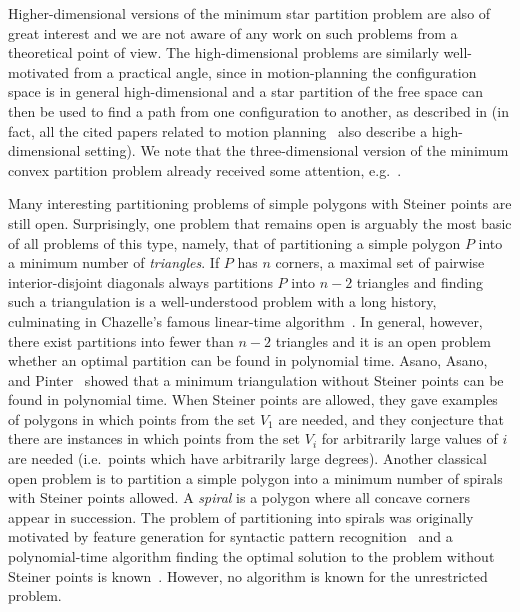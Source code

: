\documentclass[10pt,a4paper]{article}
\begin{document}
Higher-dimensional versions of the minimum star partition problem are also of great interest and we are not aware of any work on such problems from a theoretical point of view.
The high-dimensional problems are similarly well-motivated from a practical angle, since in motion-planning the configuration space is in general high-dimensional and a star partition of the free space can then be used to find a path from one configuration to another, as described in  (in fact, all the cited papers related to motion planning~\cite{varadhan2005star,dobson2014sparse, SPBG:SPBG07:073-080, lien2009planning, zhang2006fast} also describe a high-dimensional setting).
We note that the three-dimensional version of the minimum convex partition problem already received some attention, e.g.~\cite{DBLP:journals/algorithmica/ChazelleP97,DBLP:journals/siamcomp/BajajD92,DBLP:journals/siamcomp/Chazelle84}.

Many interesting partitioning problems of simple polygons with Steiner points are still open.
Surprisingly, one problem that remains open is arguably the most basic of all problems of this type, namely, that of partitioning a simple polygon $P$ into a minimum number of \emph{triangles}.
If $P$ has $n$ corners, a maximal set of pairwise interior-disjoint diagonals always partitions $P$ into $n-2$ triangles and finding such a triangulation is a well-understood problem with a long history, culminating in Chazelle's famous linear-time algorithm~\cite{DBLP:journals/dcg/Chazelle91}.
In general, however, there exist partitions into fewer than $n-2$ triangles and it is an open problem whether an optimal partition can be found in polynomial time.
Asano, Asano, and Pinter~\cite{DBLP:journals/jal/AsanoAP86} showed that a minimum triangulation without Steiner points can be found in polynomial time.
When Steiner points are allowed, they gave examples of polygons in which points from the set $V_1$ are needed, and they conjecture that there are instances in which points from the set $V_i$ for arbitrarily large values of $i$ are needed (i.e.\ points which have arbitrarily large degrees).
Another classical open problem is to partition a simple polygon into a minimum number of spirals with Steiner points allowed.
A \emph{spiral} is a polygon where all concave corners appear in succession.
The problem of partitioning into spirals was originally motivated by feature generation for syntactic pattern recognition~\cite{DBLP:journals/tc/FengP75} and a polynomial-time algorithm finding the optimal solution to the problem without Steiner points is known~\cite{DBLP:journals/siamcomp/Keil85}. However, no algorithm is known for the unrestricted problem.
\end{document}
